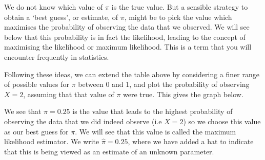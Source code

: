 \documentclass[letterpaper,10pt,english]{jupyterBook}
\begin{document}
\sphinxAtStartPar
We do not know which value of \(\pi\) is the true value. But a sensible strategy to obtain a ‘best guess’, or estimate, of \(\pi\), might be to pick the value which maximises the probability of observing the data that we observed. We will see below that this probability is in fact the likelihood, leading to the concept of maximising the likelihood or maximum likelihood. This is a term that you will encounter frequently in statistics.

\sphinxAtStartPar
Following these ideas, we can extend the table above by considering a finer range of possible values for \(\pi\) between 0 and 1, and plot the probability of observing \(X=2\), assuming that that value of \(\pi\) were true. This gives the graph below.

\begin{sphinxVerbatim}[commandchars=\\\{\}]
    

  

 
     

  \PYG{p}{[}\PYG{p}{]}   
\end{sphinxVerbatim}

\noindent{}

\sphinxAtStartPar
We see that \(\pi=0.25\) is the value that leads to the highest probability of observing the data that we did indeed observe (i.e \(X=2\)) so we choose this value as our best guess for \(\pi\). We will see that this value is called the maximum likelihood estimator. We write \(\hat{\pi} = 0.25\), where we have added a hat to indicate that this is being viewed as an estimate of an unknown parameter.
\end{document}
